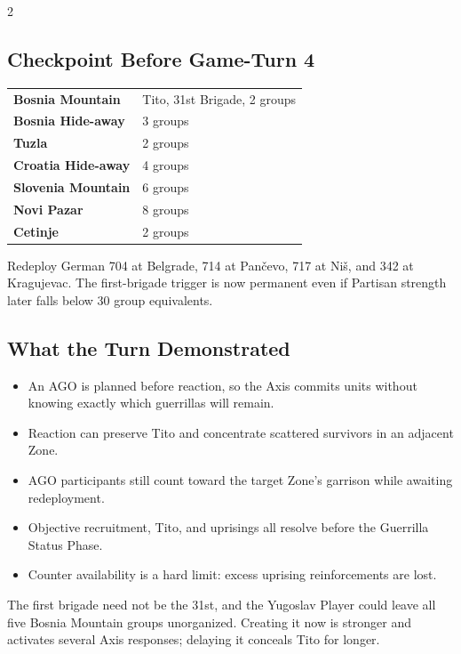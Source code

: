 \vspace{0.7em}
\begin{multicols}{2}
\small
\subsection{Checkpoint Before Game-Turn 4}

\begin{tabularx}{\linewidth}{@{}>{\bfseries}l X@{}}
  Bosnia Mountain & Tito, 31st Brigade, 2 groups \\
  Bosnia Hide-away & 3 groups \\
  Tuzla & 2 groups \\
  Croatia Hide-away & 4 groups \\
  Slovenia Mountain & 6 groups \\
  Novi Pazar & 8 groups \\
  Cetinje & 2 groups \\
\end{tabularx}

Redeploy German 704 at Belgrade, 714 at Pančevo, 717 at Niš, and 342 at
Kragujevac. The first-brigade trigger is now permanent even if Partisan
strength later falls below 30 group equivalents.

\columnbreak

\subsection{What the Turn Demonstrated}

\begin{itemize}[leftmargin=1.2em,itemsep=3pt]
  \item An AGO is planned before reaction, so the Axis commits units without
    knowing exactly which guerrillas will remain.
  \item Reaction can preserve Tito and concentrate scattered survivors in an
    adjacent Zone.
  \item AGO participants still count toward the target Zone's garrison while
    awaiting redeployment.
  \item Objective recruitment, Tito, and uprisings all resolve before the
    Guerrilla Status Phase.
  \item Counter availability is a hard limit: excess uprising reinforcements
    are lost.
\end{itemize}

\begin{commentarybox}[title={A real decision}]
The first brigade need not be the 31st, and the Yugoslav Player could leave
all five Bosnia Mountain groups unorganized. Creating it now is stronger and
activates several Axis responses; delaying it conceals Tito for longer.
\end{commentarybox}
\end{multicols}
